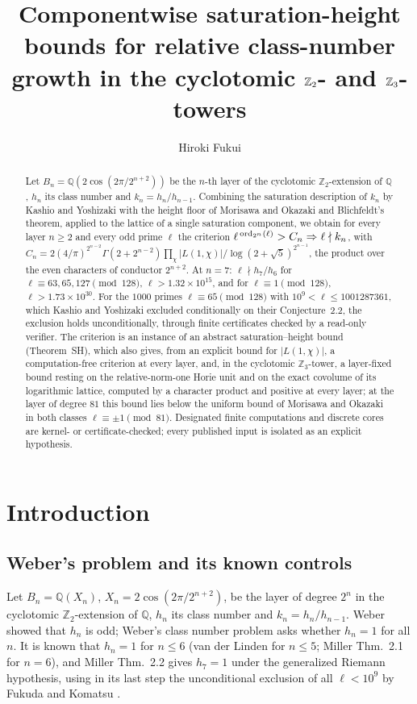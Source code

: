 \documentclass[11pt]{amsart}
\title[Componentwise saturation-height bounds]{Componentwise saturation-height bounds for relative class-number growth in the cyclotomic $\Z_2$- and $\Z_3$-towers}
\author{Hiroki Fukui}
\theoremstyle{remark}\newtheorem{remark}[theorem]{Remark}
\theoremstyle{definition}\newtheorem{definition}[theorem]{Definition}
\newcommand{\Q}{\mathbb{Q}}\newcommand{\Z}{\mathbb{Z}}\newcommand{\R}{\mathbb{R}}\newcommand{\F}{\mathbb{F}}
\begin{document}
\begin{abstract}
Let $B_n=\Q(2\cos(2\pi/2^{n+2}))$ be the $n$-th layer of the cyclotomic $\Z_2$-extension of $\Q$, $h_n$ its class number and $k_n=h_n/h_{n-1}$. Combining the saturation description of $k_n$ by Kashio and Yoshizaki with the height floor of Morisawa and Okazaki and Blichfeldt's theorem, applied to the lattice of a single saturation component, we obtain for every layer $n\ge2$ and every odd prime $\ell$ the criterion $\ell^{\,\operatorname{ord}_{2^n}(\ell)}>C_n\Rightarrow\ell\nmid k_n$, with $C_n=2(4/\pi)^{2^{n-2}}\Gamma(2+2^{n-2})\prod_{\chi}|L(1,\chi)|/\log(2+\sqrt5)^{2^{n-1}}$, the product over the even characters of conductor $2^{n+2}$. At $n=7$: $\ell\nmid h_7/h_6$ for $\ell\equiv63,65,127\pmod{128}$, $\ell>1.32\times10^{15}$, and for $\ell\equiv1\pmod{128}$, $\ell>1.73\times10^{30}$. For the $1000$ primes $\ell\equiv65\pmod{128}$ with $10^9<\ell\le1001287361$, which Kashio and Yoshizaki excluded conditionally on their Conjecture~2.2, the exclusion holds unconditionally, through finite certificates checked by a read-only verifier. The criterion is an instance of an abstract saturation--height bound (Theorem~SH), which also gives, from an explicit bound for $|L(1,\chi)|$, a computation-free criterion at every layer, and, in the cyclotomic $\Z_3$-tower, a layer-fixed bound resting on the relative-norm-one Horie unit and on the exact covolume of its logarithmic lattice, computed by a character product and positive at every layer; at the layer of degree $81$ this bound lies below the uniform bound of Morisawa and Okazaki in both classes $\ell\equiv\pm1\pmod{81}$. Designated finite computations and discrete cores are kernel- or certificate-checked; every published input is isolated as an explicit hypothesis.
\end{abstract}
\maketitle
\tableofcontents

\section{Introduction}
\subsection{Weber's problem and its known controls}
Let $B_n=\Q(X_n)$, $X_n=2\cos(2\pi/2^{n+2})$, be the layer of degree $2^n$ in the cyclotomic $\Z_2$-extension of $\Q$, $h_n$ its class number and $k_n=h_n/h_{n-1}$. Weber showed that $h_n$ is odd; Weber's class number problem asks whether $h_n=1$ for all $n$. It is known that $h_n=1$ for $n\le6$ (van der Linden for $n\le5$; Miller \cite{Mi} Thm.~2.1 for $n=6$), and Miller \cite{Mi} Thm.~2.2 gives $h_7=1$ under the generalized Riemann hypothesis, using in its last step the unconditional exclusion of all $\ell<10^9$ by Fukuda and Komatsu \cite{FK3}.
\end{document}
